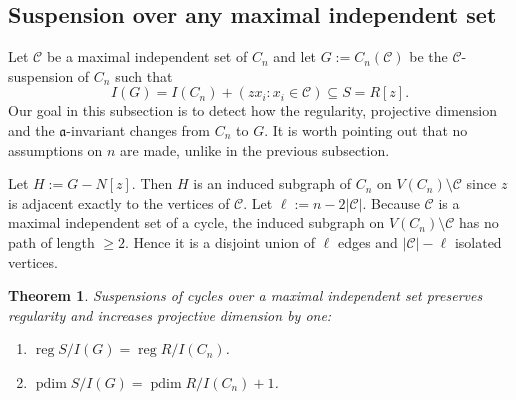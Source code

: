 \documentclass[12pt]{amsart}
\theoremstyle{plain}
\newtheorem{thm}{Theorem}[section]
\theoremstyle{definition}
\DeclareMathOperator{\reg}{reg}
\DeclareMathOperator{\pdim}{pdim}
\begin{document}
\subsection{Suspension over any maximal independent set}

Let   $\mathcal{C}$  be a maximal independent set of $C_n$ and let $G:=C_n(\mathcal{C})$ be the $\mathcal{C}$-suspension of  $C_n$  such that
$$I(G)= I(C_n)+(zx_i: x_i\in \mathcal{C})  \subseteq S=R[z].$$
 Our goal in this subsection is to detect how the regularity, projective dimension and the $\mathfrak a$-invariant changes from $C_n$ to $G$. It is worth pointing out that no assumptions on $n$ are made, unlike in the previous subsection.
 
 
\begin{observation}\label{obs:cycle_delete_C}
Let $ H:=G-N[z]$.  Then  \(H\) is an induced
subgraph of \(C_n\) on \(V(C_n)\setminus \mathcal C\) since  \(z\) is adjacent exactly to the vertices of \(\mathcal C\). Let $\ell:=n-2|\mathcal{C}|$. Because $\mathcal{C}$ is a maximal independent set of a cycle, the induced
subgraph on $V(C_n)\setminus \mathcal{C}$ has no path of length $\ge 2$. Hence it is a disjoint union of
$\ell$ edges and \(|\mathcal C|-\ell\) isolated vertices. 
\end{observation}


\begin{thm}\label{thm:cycle_reg_pdim}
Suspensions of cycles over a maximal independent set preserves regularity and increases projective dimension by one:
 \begin{enumerate}
     \item[(a)] $\reg S/ I(G) = \reg R/I(C_n)$. 
     \item[(b)] $\pdim S/ I(G) = \pdim R/I(C_n)+1$.
 \end{enumerate}
\end{thm}
\end{document}
